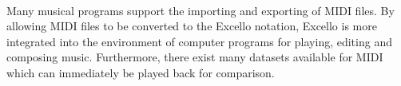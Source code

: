 \paragraph{} Many musical programs support the importing and exporting of MIDI files. By allowing MIDI files to be converted to the Excello notation, Excello is more integrated into the environment of computer programs for playing, editing and composing music. Furthermore, there exist many datasets available for MIDI \cite{huang:deep} which can immediately be played back for comparison.
